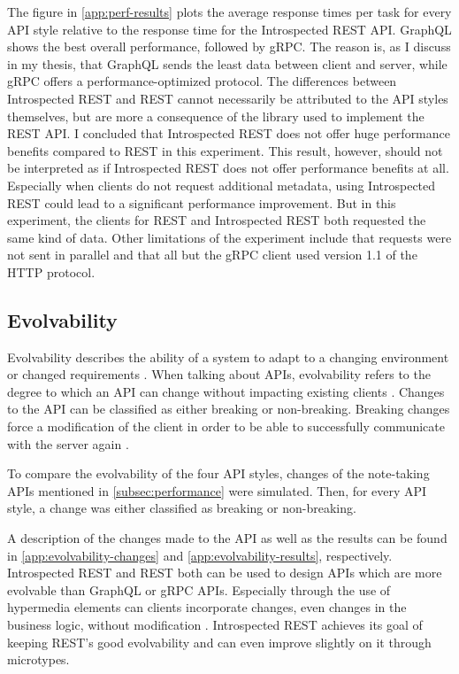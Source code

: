 The figure in \cref{app:perf-results} plots the average response times per task for every API style relative to the response time for the Introspected REST API\@. GraphQL shows the best overall performance, followed by gRPC. The reason is, as I discuss in my thesis, that GraphQL sends the least data between client and server, while gRPC offers a performance-optimized protocol. The differences between Introspected REST and REST cannot necessarily be attributed to the API styles themselves, but are more a consequence of the library used to implement the REST API. I concluded that Introspected REST does not offer huge performance benefits compared to REST in this experiment. This result, however, should not be interpreted as if Introspected REST does not offer performance benefits at all. Especially when clients do not request additional metadata, using Introspected REST could lead to a significant performance improvement. But in this experiment, the clients for REST and Introspected REST both requested the same kind of data. Other limitations of the experiment include that requests were not sent in parallel and that all but the gRPC client used version 1.1 of the HTTP protocol.

\subsection{Evolvability}
Evolvability describes the ability of a system to adapt to a changing environment or changed requirements \autocite{Breivold2007}. When talking about APIs, evolvability refers to the degree to which an API can change without impacting existing clients \autocite[p.~34]{Fielding2000}. Changes to the API can be classified as either breaking or non-breaking. Breaking changes force a modification of the client in order to be able to successfully communicate with the server again \autocite[p.~215]{Lauret2019}.

To compare the evolvability of the four API styles, changes of the note-taking APIs mentioned in \cref{subsec:performance} were simulated. Then, for every API style, a change was either classified as breaking or non-breaking.

A description of the changes made to the API as well as the results can be found in \cref{app:evolvability-changes} and \cref{app:evolvability-results}, respectively. Introspected REST and REST both can be used to design APIs which are more evolvable than GraphQL or gRPC APIs. Especially through the use of hypermedia elements can clients incorporate changes, even changes in the business logic, without modification \autocite[37:35–-38:47]{Drotbohm2019}. Introspected REST achieves its goal of keeping REST's good evolvability and can even improve slightly on it through microtypes.

